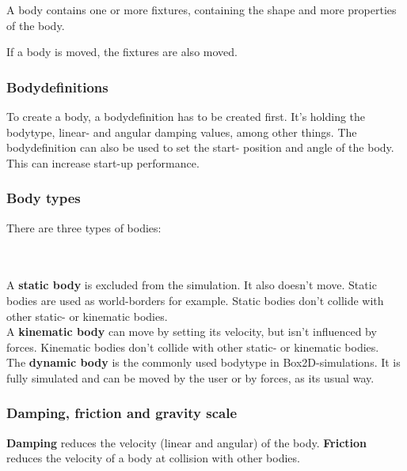 \documentclass[10pt,a4paper,DIV=11]{scrreprt}
\begin{document}
A body contains one or more fixtures, containing the shape and more properties of the body.

If a body is moved, the fixtures are also moved.

\subsubsection*{Bodydefinitions}
To create a body, a bodydefinition has to be created first. It's holding the bodytype, linear- and angular damping values, among other things.
The bodydefinition can also be used to set the start- position and angle of the body. This can increase start-up performance.

\subsubsection*{Body types}
There are three types of bodies:

   \\
\\

A \textbf{static body} is excluded from the simulation. It also doesn't move. Static bodies are used as world-borders for example. Static bodies don't collide with other static- or kinematic bodies. \\

A \textbf{kinematic body} can move by setting its velocity, but isn't influenced by forces.
Kinematic bodies don't collide with other static- or kinematic bodies.\\

The \textbf{dynamic body} is the commonly used bodytype in Box2D-simulations. It is fully simulated and can be moved by the user or by forces, as its usual way.

\subsubsection*{Damping, friction and gravity scale}
\textbf{Damping} reduces the velocity (linear and angular) of the body.
\textbf{Friction} reduces the velocity of a body at collision with other bodies.
\end{document}
